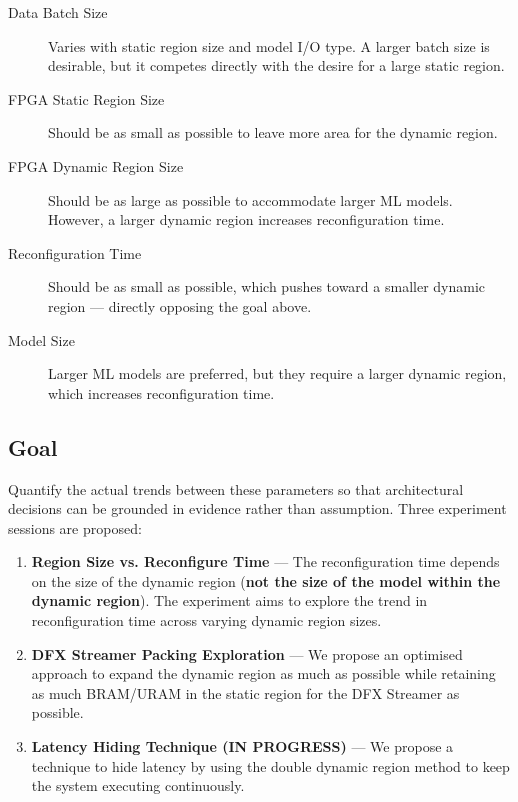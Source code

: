 \documentclass{cernatsnote}
\begin{document}
\begin{description}
  \item[Data Batch Size]
    Varies with static region size and model I/O type.
    A larger batch size is desirable, but it competes directly with the desire for a large static region.

  \item[FPGA Static Region Size]
    Should be as small as possible to leave more area for the dynamic region.

  \item[FPGA Dynamic Region Size]
    Should be as large as possible to accommodate larger ML models.
    However, a larger dynamic region increases reconfiguration time.

  \item[Reconfiguration Time]
    Should be as small as possible, which pushes toward a smaller dynamic region --- directly opposing the goal above.

  \item[Model Size]
    Larger ML models are preferred, but they require a larger dynamic region, which increases reconfiguration time.

\end{description}

\subsection{Goal}

Quantify the actual trends between these parameters so that architectural decisions can be grounded in evidence rather than assumption. Three experiment sessions are proposed:

\begin{enumerate}

  \item \textbf{Region Size vs. Reconfigure Time} ---
    The reconfiguration time depends on the size of the dynamic region (\textbf{not the size of the model within the dynamic region}). The experiment aims to explore the trend in reconfiguration time across varying dynamic region sizes.

  \item \textbf{DFX Streamer Packing Exploration} ---
    We propose an optimised approach to expand the dynamic region as much as possible while retaining as much BRAM/URAM in the static region for the DFX Streamer as possible.

  \item \textbf{Latency Hiding Technique (IN PROGRESS)} ---
    We propose a technique to hide latency by using the double dynamic region method to keep the system executing continuously.


\end{enumerate}
\end{document}
